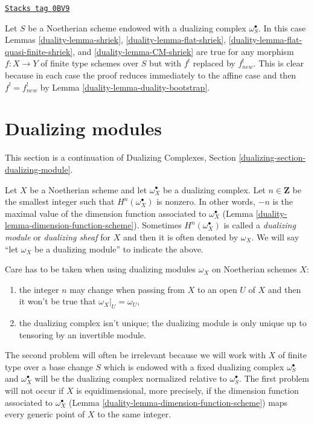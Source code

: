 \begin{remark}
\label{duality-remark-the-same-is-true}
\href{https://stacks.math.columbia.edu/tag/0BV9}{\texttt{Stacks tag 0BV9}}

Let $S$ be a Noetherian scheme endowed with a dualizing complex
$\omega_S^\bullet$. In this case
Lemmas \ref{duality-lemma-shriek}, \ref{duality-lemma-flat-shriek},
\ref{duality-lemma-flat-quasi-finite-shriek}, and \ref{duality-lemma-CM-shriek}
are true for any morphism $f : X \to Y$ of finite type schemes over $S$
but with $f^!$ replaced by $f_{new}^!$. This is clear because in each
case the proof reduces immediately to the affine case
and then $f^! = f_{new}^!$ by Lemma \ref{duality-lemma-duality-bootstrap}.
\end{remark}

\section{Dualizing modules}
\label{duality-section-dualizing-module}
This section is a continuation of
Dualizing Complexes, Section \ref{dualizing-section-dualizing-module}.

\medskip\noindent
Let $X$ be a Noetherian scheme and let $\omega_X^\bullet$ be a
dualizing complex. Let $n \in \mathbf{Z}$ be the smallest integer such that
$H^n(\omega_X^\bullet)$ is nonzero. In other words, $-n$ is the maximal
value of the dimension function associated to $\omega_X^\bullet$
(Lemma \ref{duality-lemma-dimension-function-scheme}).
Sometimes $H^n(\omega_X^\bullet)$
is called a {\it dualizing module} or {\it dualizing sheaf}
for $X$ and then it is often denoted
by $\omega_X$. We will say ``let $\omega_X$ be a dualizing module''
to indicate the above.

\medskip\noindent
Care has to be taken when using dualizing modules $\omega_X$ on Noetherian
schemes $X$:
\begin{enumerate}
\item the integer $n$ may change when passing from $X$ to an open $U$
of $X$ and then it won't be true that $\omega_X|_U = \omega_U$,
\item the dualizing complex isn't unique; the dualizing module
is only unique up to tensoring by an invertible module.
\end{enumerate}
The second problem will often be irrelevant because we will work
with $X$ of finite type over a base change $S$ which is
endowed with a fixed dualizing complex $\omega_S^\bullet$ and
$\omega_X^\bullet$ will be the dualizing complex normalized relative
to $\omega_S^\bullet$.
The first problem will not occur if $X$ is equidimensional, more precisely,
if the dimension function associated to $\omega_X^\bullet$
(Lemma \ref{duality-lemma-dimension-function-scheme})
maps every generic point of $X$ to the same integer.

